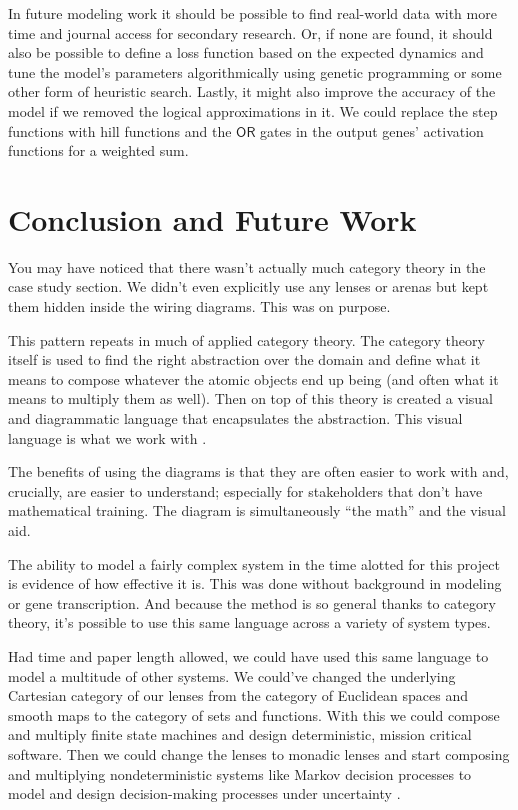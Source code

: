 \documentclass[12pt]{article}
\begin{document}
In future modeling work it should be possible to find real-world data with more time and journal access for secondary research.
Or, if none are found, it should also be possible to define a loss function based on the expected dynamics and tune the model's parameters algorithmically using genetic programming or some other form of heuristic search.
Lastly, it might also improve the accuracy of the model if we removed the logical approximations in it.
We could replace the step functions with hill functions and the $\mathsf{OR}$ gates in the output genes' activation functions for a weighted sum.




\section*{Conclusion and Future Work}
You may have noticed that there wasn't actually much category theory in the case study section.
We didn't even explicitly use any lenses or arenas but kept them hidden inside the wiring diagrams.
This was on purpose.

This pattern repeats in much of applied category theory.
The category theory itself is used to find the right abstraction over the domain and define what it means to compose whatever the atomic objects end up being (and often what it means to multiply them as well).
Then on top of this theory is created a visual and diagrammatic language that encapsulates the abstraction.
This visual language is what we work with \cite{Coecke_Kissinger_2017, fong2019invitation,myers2022categorical}.

The benefits of using the diagrams is that they are often easier to work with and, crucially, are easier to understand; especially for stakeholders that don't have mathematical training.
The diagram is simultaneously ``the math'' and the visual aid.


The ability to model a fairly complex system in the time alotted for this project is evidence of how effective it is.
This was done without background in modeling or gene transcription.
And because the method is so general thanks to category theory, it's possible to use this same language across a variety of system types.

Had time and paper length allowed, we could have used this same language to model a multitude of other systems.
We could've changed the underlying Cartesian category of our lenses from the category of Euclidean spaces and smooth maps to the category of sets and functions.
With this we could compose and multiply finite state machines and design deterministic, mission critical software.
Then we could change the lenses to monadic lenses and start composing and multiplying nondeterministic systems like Markov decision processes to model and design decision-making processes under uncertainty \cite{myers2022categorical}.
\end{document}
